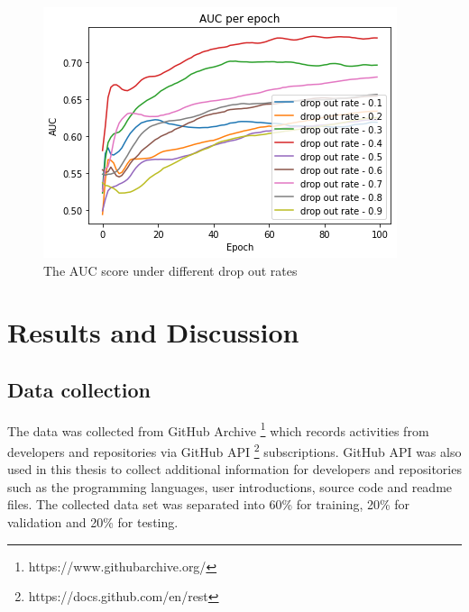 \documentclass[11pt,twoside]{report}
\begin{document}
\begin{figure}[H]
    \centering
    \includegraphics[scale=0.9]{auc_drop_out_rate.png}
    \caption{The AUC score under different drop out rates}
    \label{fig:auc_drop_out_rate}
\end{figure}




\chapter{Results and Discussion}
\section{Data collection}
The data was collected from GitHub Archive \footnote{https://www.githubarchive.org/} which records activities from developers and repositories via GitHub API \footnote{https://docs.github.com/en/rest} subscriptions. GitHub API was also used in this thesis to collect additional information for developers and repositories such as the programming languages, user introductions, source code and readme files. The collected data set was separated into 60\% for training, 20\% for validation and 20\% for testing.
\end{document}
